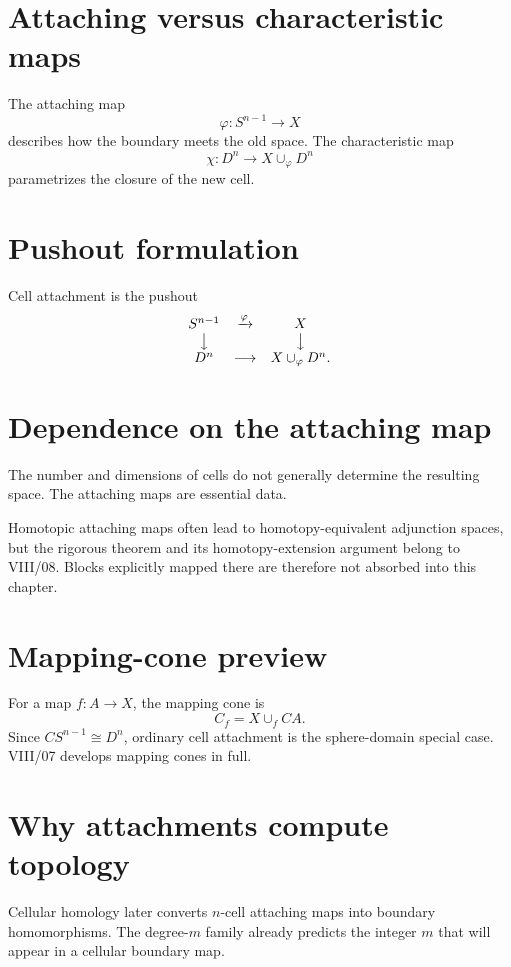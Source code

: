 \section{Attaching versus characteristic maps}
The attaching map
\[
\varphi:S^{n-1}\to X
\]
describes how the boundary meets the old space.  The characteristic map
\[
\chi:D^n\to X\cup_\varphi D^n
\]
parametrizes the closure of the new cell.

\section{Pushout formulation}
Cell attachment is the pushout
\[
\begin{array}{ccc}
S^{n-1}&\xrightarrow{\varphi}&X\\
\big\downarrow&&\big\downarrow\\
D^n&\longrightarrow&X\cup_\varphi D^n.
\end{array}
\]

\section{Dependence on the attaching map}
\begin{warning}\label{warn:viii05-map-matters}
The number and dimensions of cells do not generally determine the resulting
space.  The attaching maps are essential data.
\end{warning}

Homotopic attaching maps often lead to homotopy-equivalent adjunction spaces,
but the rigorous theorem and its homotopy-extension argument belong to VIII/08.
Blocks explicitly mapped there are therefore not absorbed into this chapter.

\section{Mapping-cone preview}
For a map \(f:A\to X\), the mapping cone is
\[
C_f=X\cup_f CA.
\]
Since \(CS^{n-1}\cong D^n\), ordinary cell attachment is the sphere-domain
special case.  VIII/07 develops mapping cones in full.

\section{Why attachments compute topology}
Cellular homology later converts \(n\)-cell attaching maps into boundary
homomorphisms.  The degree-\(m\) family already predicts the integer \(m\) that
will appear in a cellular boundary map.

